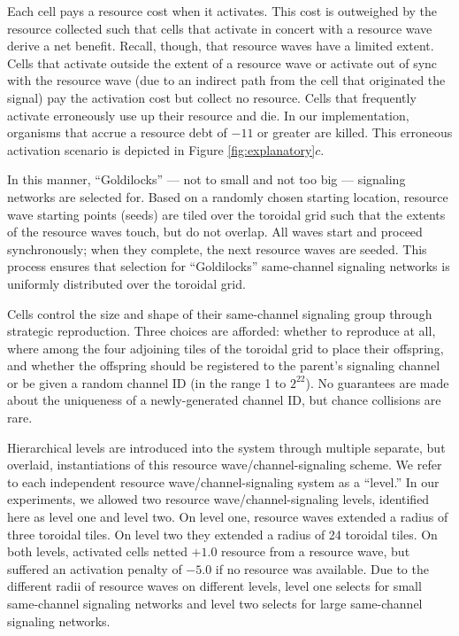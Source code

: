 Each cell pays a resource cost when it activates.
This cost is outweighed by the resource collected such that cells that activate in concert with a resource wave derive a net benefit.
Recall, though, that resource waves have a limited extent.
Cells that activate outside the extent of a resource wave or activate out of sync with the resource wave (due to an indirect path from the cell that originated the signal) pay the activation cost but collect no resource.
Cells that frequently activate erroneously use up their resource and die.
In our implementation, organisms that accrue a resource debt of $-11$ or greater are killed.
This erroneous activation scenario is depicted in Figure \ref{fig:explanatory}$c$.

In this manner, ``Goldilocks'' --- not to small and not too big --- signaling networks are selected for.
Based on a randomly chosen starting location, resource wave starting points (seeds) are tiled over the toroidal grid such that the extents of the resource waves touch, but do not overlap.
All waves start and proceed synchronously;
when they complete, the next resource waves are seeded.
This process ensures that selection for ``Goldilocks'' same-channel signaling networks is uniformly distributed over the toroidal grid.

Cells control the size and shape of their same-channel signaling group through strategic reproduction.
Three choices are afforded: whether to reproduce at all, where among the four adjoining tiles of the toroidal grid to place their offspring, and whether the offspring should be registered to the parent's signaling channel or be given a random channel ID (in the range 1 to $2^{22}$).
No guarantees are made about the uniqueness of a newly-generated channel ID, but chance collisions are rare.

Hierarchical levels are introduced into the system through multiple separate, but overlaid, instantiations of this resource wave/channel-signaling scheme.
We refer to each independent resource wave/channel-signaling system as a ``level.''
In our experiments, we allowed two resource wave/channel-signaling levels, identified here as level one and level two.
On level one, resource waves extended a radius of three toroidal tiles.
On level two they extended a radius of 24 toroidal tiles.
On both levels, activated cells netted $+1.0$ resource from a resource wave, but suffered an activation penalty of $-5.0$ if no resource was available.
Due to the different radii of resource waves on different levels, level one selects for small same-channel signaling networks and level two selects for large same-channel signaling networks.

